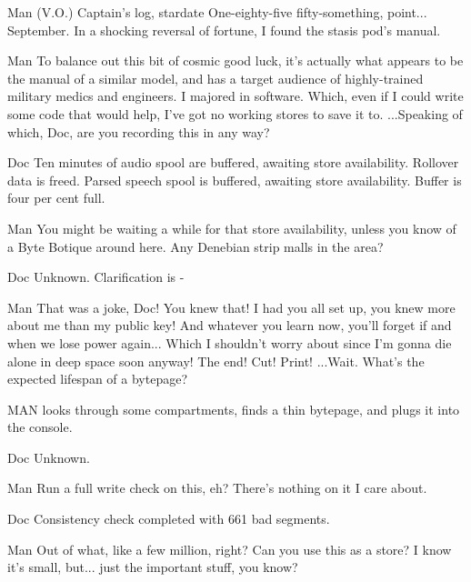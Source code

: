 \documentclass{screenplay}
\begin{document}
\begin{dialogue}{Man (V.O.)}
Captain's log, stardate One-eighty-five fifty-something, point... September.  In a shocking reversal of fortune, I found the stasis pod's manual.
\end{dialogue}
\begin{dialogue}[cont.]{Man}
To balance out this bit of cosmic good luck, it's actually what appears to be the manual of a similar model, and has a target audience of highly-trained military medics and engineers.  I majored in software.  Which, even if I could write some code that would help, I've got no working stores to save it to.  ...Speaking of which, Doc, are you recording this in any way?
\end{dialogue}
\begin{dialogue}{Doc}
Ten minutes of audio spool are buffered, awaiting store availability.  Rollover data is freed.  Parsed speech spool is buffered, awaiting store availability.  Buffer is four per cent full.
\end{dialogue}
\begin{dialogue}{Man}
You might be waiting a while for that store availability, unless you know of a Byte Botique around here.  Any Denebian strip malls in the area?
\end{dialogue}
\begin{dialogue}{Doc}
Unknown.  Clarification is -
\end{dialogue}
\begin{dialogue}[frustrated]{Man}
That was a joke, Doc!  You knew that!  I had you all set up, you knew more about me than my public key!  And whatever you learn now, you'll forget if and when we lose power again...  Which I shouldn't worry about since I'm gonna die alone in deep space soon anyway!  The end!  Cut!  Print!  ...Wait.  What's the expected lifespan of a bytepage?
\end{dialogue}
MAN looks through some compartments, finds a thin bytepage, and plugs it into the console.
\begin{dialogue}{Doc}
Unknown.
\end{dialogue}
\begin{dialogue}{Man}
Run a full write check on this, eh?  There's nothing on it I care about.
\end{dialogue}
\begin{dialogue}{Doc}
Consistency check completed with 661 bad segments.
\end{dialogue}
\begin{dialogue}{Man}
Out of what, like a few million, right?  Can you use this as a store?  I know it's small, but... just the important stuff, you know?
\end{dialogue}
\end{document}
